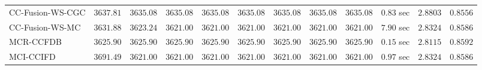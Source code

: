 \begin{table}[H]
\begin{tabular}{lrrrrrrrrrrr}
    CC-Fusion-WS-CGC & $      3637.81$ & $      3635.08$ & $      3635.08$ & $      3635.08$ & $      3635.08$ & $      3635.08$ & $      3635.08$ & $      3635.08$ & $         0.83$ sec    & $       2.8803$  & $       0.8556$ \\ 
     CC-Fusion-WS-MC & $      3631.88$ & $      3623.24$ & $      3621.00$ & $      3621.00$ & $      3621.00$ & $      3621.00$ & $      3621.00$ & $      3621.00$ & $         7.90$ sec    & $       2.8324$  & $       0.8586$ \\ 
\cmidrule{1-1} 
           MCR-CCFDB & $      3625.90$ & $      3625.90$ & $      3625.90$ & $      3625.90$ & $      3625.90$ & $      3625.90$ & $      3625.90$ & $      3625.90$ & $         0.15$ sec    & $       2.8115$  & $       0.8592$ \\ 
\cmidrule{1-1} 
           MCI-CCIFD & $      3691.49$ & $      3621.00$ & $      3621.00$ & $      3621.00$ & $      3621.00$ & $      3621.00$ & $      3621.00$ & $      3621.00$ & $         0.97$ sec    & $       2.8324$  & $       0.8586$ \\ 
\bottomrule
\end{tabular}
\end{table}

